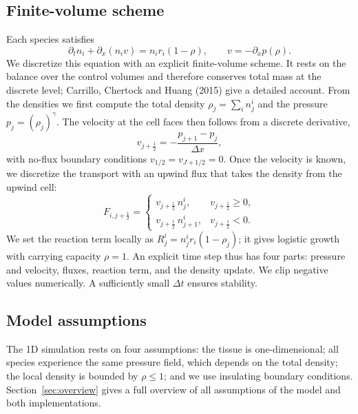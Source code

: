 \documentclass[11pt]{article}
\begin{document}
\subsection{Finite-volume scheme}
\label{sec:fv1d}
Each species satisfies
\begin{equation}
    \partial_t n_i + \partial_x (n_i v) = n_i r_i (1 - \rho), \qquad
    v = -\partial_x p(\rho).
\end{equation}
We discretize this equation with an explicit finite-volume scheme. It rests on the
balance over the control volumes and therefore conserves total mass at the
discrete level; Carrillo, Chertock and Huang (2015) give a detailed account. From
the densities we first compute the total density $\rho_j = \sum_i n^{i}_j$ and the
pressure $p_j = (\rho_j)^\gamma$. The velocity at the cell faces then follows from
a discrete derivative,
\begin{equation}
    v_{j + \frac{1}{2}} = -\frac{p_{j+1} - p_j}{\Delta x},
\end{equation}
with no-flux boundary conditions $v_{1/2} = v_{J + 1/2} = 0$. Once the velocity is
known, we discretize the transport with an upwind flux that takes the density from
the upwind cell:
\begin{equation}
    F_{i, j + \frac{1}{2}} =
    \begin{cases}
        v_{j + \frac{1}{2}}\, n^{i}_j,     & v_{j + \frac{1}{2}} \ge 0, \\[4pt]
        v_{j + \frac{1}{2}}\, n^{i}_{j+1}, & v_{j + \frac{1}{2}} < 0.
    \end{cases}
\end{equation}
We set the reaction term locally as $R^{i}_j = n^{i}_j r_i (1 - \rho_j)$; it gives
logistic growth with carrying capacity $\rho = 1$. An explicit time step thus has
four parts: pressure and velocity, fluxes, reaction term, and the density update.
We clip negative values numerically. A sufficiently small $\Delta t$ ensures
stability.

\subsection{Model assumptions}
\label{sec:assumptions1d}
The 1D simulation rests on four assumptions: the tissue is one-dimensional; all
species experience the same pressure field, which depends on the total density;
the local density is bounded by $\rho \le 1$; and we use insulating boundary
conditions. Section~\ref{sec:overview} gives a full overview of all assumptions of
the model and both implementations.
\end{document}
